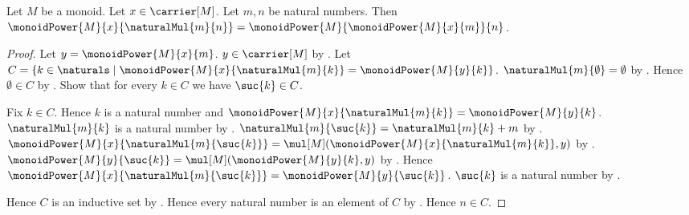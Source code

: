 \begin{theorem}\label{monoid_power_multiplication}
    Let $M$ be a monoid.
    Let $x\in\carrier[M]$.
    Let $m,n$ be natural numbers.
    Then $\monoidPower{M}{x}{\naturalMul{m}{n}}=
        \monoidPower{M}{\monoidPower{M}{x}{m}}{n}$.
\end{theorem}
\begin{proof}
    Let $y=\monoidPower{M}{x}{m}$.
    $y\in\carrier[M]$ by .
    Let $C=\{k\in\naturals\mid
        \monoidPower{M}{x}{\naturalMul{m}{k}}=
            \monoidPower{M}{y}{k}\}$.
    $\naturalMul{m}{\emptyset}=\emptyset$ by
        .
    Hence $\emptyset\in C$ by
        .
    Show that for every $k\in C$ we have $\suc{k}\in C$.
    \begin{subproof}
        Fix $k\in C$.
        Hence $k$ is a natural number and
            $\monoidPower{M}{x}{\naturalMul{m}{k}}=
                \monoidPower{M}{y}{k}$.
        $\naturalMul{m}{k}$ is a natural number by
            .
        $\naturalMul{m}{\suc{k}}=\naturalMul{m}{k}+m$ by
            .
        $\monoidPower{M}{x}{\naturalMul{m}{\suc{k}}}=
            \mul[M](\monoidPower{M}{x}{\naturalMul{m}{k}},y)$ by
            .
        $\monoidPower{M}{y}{\suc{k}}=
            \mul[M](\monoidPower{M}{y}{k},y)$ by
            .
        Hence $\monoidPower{M}{x}{\naturalMul{m}{\suc{k}}}=
            \monoidPower{M}{y}{\suc{k}}$.
        $\suc{k}$ is a natural number by .
    \end{subproof}
    Hence $C$ is an inductive set by .
    Hence every natural number is an element of $C$ by
        .
    Hence $n\in C$.
\end{proof}

